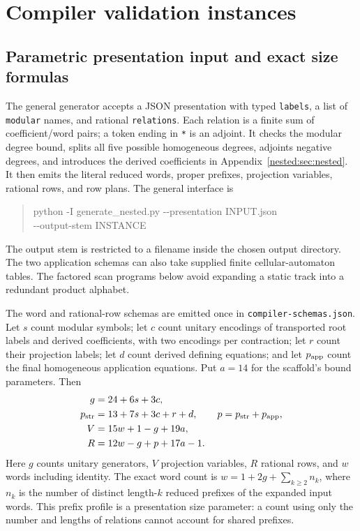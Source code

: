 \section{Compiler validation instances}\label{sec:nestedchecks}
\subsection{Parametric presentation input and exact size formulas}
The general generator accepts a JSON presentation with typed
\texttt{labels}, a list of \texttt{modular} names, and rational
\texttt{relations}. Each relation is a finite sum of coefficient/word
pairs; a token ending in \texttt{*} is an adjoint. It checks the
modular degree bound, splits all five possible homogeneous degrees,
adjoints negative degrees, and introduces the derived coefficients
in Appendix~\ref{nested:sec:nested}. It then emits the literal reduced words,
proper prefixes, projection variables, rational rows, and row plans.
The general interface is
\begin{quote}\small\ttfamily
python -I generate\_nested.py -{}-presentation INPUT.json\\
\hspace*{1em}-{}-output-stem INSTANCE
\end{quote}
The output stem is restricted to a filename inside the chosen output directory. The two application schemas can also take supplied finite
cellular-automaton tables. The factored scan programs below avoid
expanding a static track into a redundant product alphabet.

The word and rational-row schemas are emitted once in
\texttt{compiler-schemas.json}. Let $s$ count modular symbols; let $c$
count unitary encodings of transported root labels and derived
coefficients, with two encodings per contraction; let $r$ count their
projection labels; let $d$ count derived defining equations; and let
$p_{\rm app}$ count the final homogeneous application equations.
Put $a=14$ for the scaffold's bound parameters. Then
\begin{align}
 g&=24+6s+3c,\nonumber\\
 p_{\rm str}&=13+7s+3c+r+d,\qquad p=p_{\rm str}+p_{\rm app},\nonumber\\
 V&=15w+1-g+19a,\nonumber\\
 R&=12w-g+p+17a-1.                                         \label{eq:validation-V1}
\end{align}
Here $g$ counts unitary generators, $V$ projection variables, $R$
rational rows, and $w$ words including identity. The exact word count is
$w=1+2g+\sum_{k\ge2}n_k$, where $n_k$ is the number of distinct
length-$k$ reduced prefixes of the expanded input words. This prefix
profile is a presentation size parameter: a count using only the
number and lengths of relations cannot account for shared prefixes.

